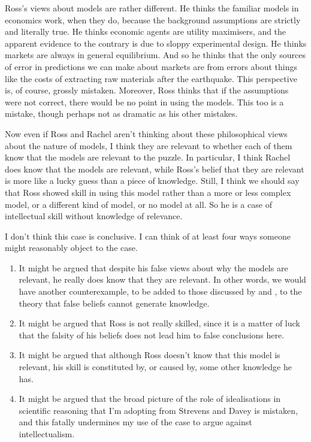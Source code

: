 Ross's views about models are rather different. He thinks the familiar models in economics work, when they do, because the background assumptions are strictly and literally true. He thinks economic agents are utility maximisers, and the apparent evidence to the contrary is due to sloppy experimental design. He thinks markets are always in general equilibrium. And so he thinks that the only sources of error in predictions we can make about markets are from errors about things like the costs of extracting raw materials after the earthquake. This perspective is, of course, grossly mistaken. Moreover, Ross thinks that if the assumptions were not correct, there would be no point in using the models. This too is a mistake, though perhaps not as dramatic as his other mistakes.

Now even if Ross and Rachel aren't thinking about these philosophical views about the nature of models, I think they are relevant to whether each of them know that the models are relevant to the puzzle. In particular, I think Rachel does know that the models are relevant, while Ross's belief that they are relevant is more like a lucky guess than a piece of knowledge. Still, I think we should say that Ross showed skill in using this model rather than a more or less complex model, or a different kind of model, or no model at all. So he is a case of intellectual skill without knowledge of relevance.

I don't think this case is conclusive. I can think of at least four ways someone might reasonably object to the case. 

\begin{enumerate}
\item It might be argued that despite his false views about why the models are relevant, he really does know that they are relevant. In other words, we would have another counterexample, to be added to those discussed by \citet{Warfield2005} and \citet{Luzzi2010}, to the theory that false beliefs cannot generate knowledge.

\item It might be argued that Ross is not really skilled, since it is a matter of luck that the falsity of his beliefs does not lead him to false conclusions here.

\item It might be argued that although Ross doesn't know that this model is relevant, his skill is constituted by, or caused by, some other knowledge he has.

\item It might be argued that the broad picture of the role of idealisations in scientific reasoning that I'm adopting from Strevens and Davey is mistaken, and this fatally undermines my use of the case to argue against intellectualism.

\end{enumerate}

